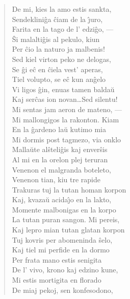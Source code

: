 \begin{verse}
                De mi, kies la amo estis sankta,\\
                Sendeklini\^ga \^ciam de la \^{\j}uro,\\
                Farita en la tago de l' edzi\^go, ---\\
                \^Si malalti\^gis al pekulo, kiun\\
                Per \^cio la naturo ja malbenis!\\
                Sed kiel virton peko ne delogas,\\
                Se \^gi e\^c en \^ciela vest' aperas,\\
                Tiel volupto, se e\^c kun an\^gelo\\
                Vi ligos \^gin, enuas tamen balda\u u\\
                Kaj ser\^cas ion novan\dots Sed silentu!\\
                Mi sentas jam aeron de mateno, ---\\
                Mi mallongigos la rakonton. Kiam\\
                En la \^gardeno la\u u kutimo mia\\
                Mi dormis post tagmezo, via onklo\\
                Malla\u ute al\^steli\^gis kaj enver\^sis\\
                Al mi en la orelon plej teruran\\
                Venenon el malgranda boteleto,\\
                Venenon tian, kiu tre rapide\\
                Trakuras tuj la tutan homan korpon\\
                Kaj, kvaza\u u acida\^{\j}o en la lakto,\\
                Momente malbonigas en la korpo\\
                La tutan puran sangon. Mi pereis,\\
                Kaj lepro mian tutan glatan korpon\\
                Tuj kovris per abomeninda \^selo,\\
                Kaj tiel mi perfide en la dormo\\
                Per frata mano estis senigita\\
                De l' vivo, krono kaj edzino kune,\\
                Mi estis mortigita en florado\\
                De miaj pekoj, sen konfesodono,\\

\end{verse}
